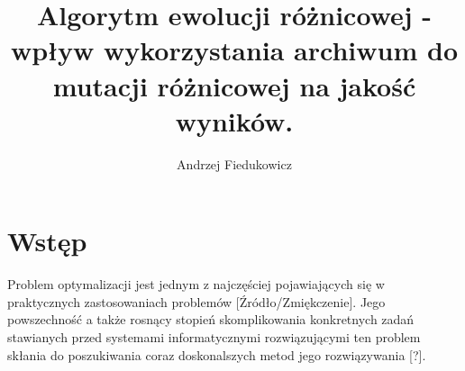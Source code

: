 \documentclass[11pt]{report}
\title{\textbf{Algorytm ewolucji różnicowej - wpływ wykorzystania archiwum do mutacji różnicowej na jakość wyników.}}
\author{Andrzej Fiedukowicz}
\date{}
\begin{document}
\maketitle
\tableofcontents


\chapter{Wstęp}
\par{
Problem optymalizacji jest jednym z najczęściej pojawiających się w praktycznych zastosowaniach problemów [Źródło/Zmiękczenie].
Jego powszechność a także rosnący stopień skomplikowania konkretnych zadań stawianych przed systemami informatycznymi rozwiązującymi ten problem skłania do poszukiwania coraz doskonalszych metod jego rozwiązywania [?].
}
\end{document}
